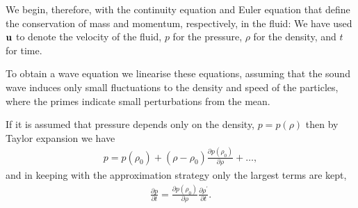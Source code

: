 We begin, therefore, with the continuity equation and Euler equation that define the conservation of mass and momentum, respectively,
in the fluid:
%
%
We have used  $\textbf{u}$ to denote the velocity of the fluid, $p$ for the pressure, $\rho$ for the density, and $t$ for time.

To obtain a wave equation we linearise these equations, assuming that the sound wave induces only small fluctuations to the density and speed of the particles,
where the primes indicate  small perturbations from the mean.

If it is assumed that pressure depends only on the density, $p=p(\rho)$
then by Taylor expansion we have
\begin{align}
p = p(\rho_0) + (\rho-\rho_0) \frac{\partial p(\rho_0)}{\partial \rho} + \ldots,
\end{align}
and in keeping with the approximation strategy only the largest terms are kept,
\begin{align}
  \label{eqn:taylorLargest}
 \frac{\partial p}{\partial t} = \frac{\partial p(\rho_0)}{\partial \rho} \frac{\partial \rho^\prime}{\partial t}.
\end{align}

